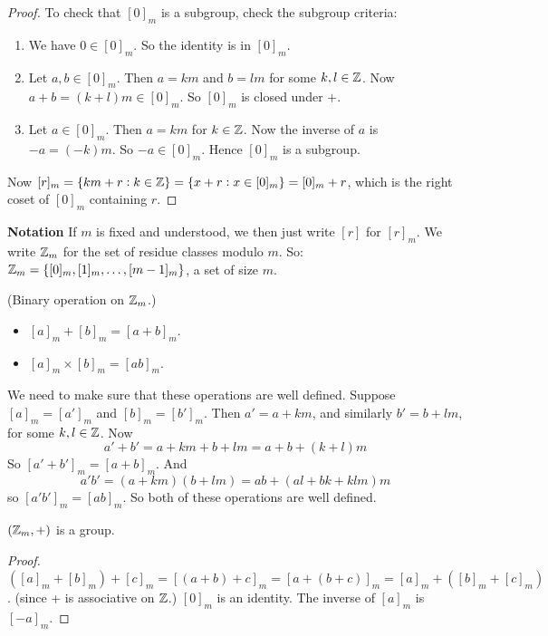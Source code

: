 \documentclass[10pt]{scrartcl}
\begin{document}
\begin{proof}
To check that $[0]_m$ is a subgroup, check the subgroup criteria:\begin{enumerate}
\item We have $ 0 \in [0]_m$. So the identity is in $[0]_m$.
\item Let $a,b \in [0]_m$. Then $a = km$ and $b = lm$ for some $k,l \in \mathbb{Z}$. Now $a+b = (k+l)m\in [0]_m$. So $[0]_m$ is closed under $+$.
\item Let $a \in [0]_m$. Then $a = km$ for $ k \in \mathbb{Z}$. Now the inverse of $a$ is $-a = (-k)m$. So $-a \in [0]_m$. Hence $[0]_m$ is a subgroup. 	
\end{enumerate}

Now $[r]_m = \{km + r : k \in \mathbb{Z}\} = \{x + r : x \in [0]_m\} = [0]_m + r$, which is the right coset of $[0]_m$ containing $r$. 
\end{proof}\vspace*{5pt}


\textbf{Notation} If $m$ is fixed and understood, we then just write $[r]$ for $[r]_m$. We write $\mathbb{Z} _m$ for the set of residue classes modulo $m$. So:\\
 $\mathbb{Z} _m = \{[0]_m,[1]_m,\dots,[m-1]_m\}$, a set of size $m$.\\
 
 
\begin{definition}(Binary operation on $\mathbb{Z}_m$.)\begin{itemize}
\item[] $[a]_m + [b]_m = [a+b]_m$. 
\item[] $[a]_m \times [b]_m = [ab]_m$.
\end{itemize}
\end{definition}

We need to make sure that these operations are well defined. Suppose $[a]_m = [a']_m$ and $[b]_m = [b']_m$. Then $a' = a + km$, and similarly $b' = b + lm$, for some $k,l \in \mathbb{Z}$. Now \[a' + b' = a + km + b + lm = a +b + (k+l)m\] So $[a'+b']_m = [a+b]_m$. And \[a'b' = (a+km)(b + lm) = ab + (al+ bk + klm)m\] so $[a'b']_m = [ab]_m$. So both of these operations are well defined.\\
 
 
\begin{proposition} $(\mathbb{Z}_m,+)$ is a group.	
\end{proposition}

\begin{proof}
$([a]_m + [b]_m) + [c]_m = [(a+b) + c]_m = [a+(b+c)]_m = [a]_m + ([b]_m + [c]_m)$. (since + is associative on $\mathbb{Z}$.) $[0]_m$ is an identity. The inverse of $[a]_m$ is $[-a]_m$.
\end{proof}
\end{document}
